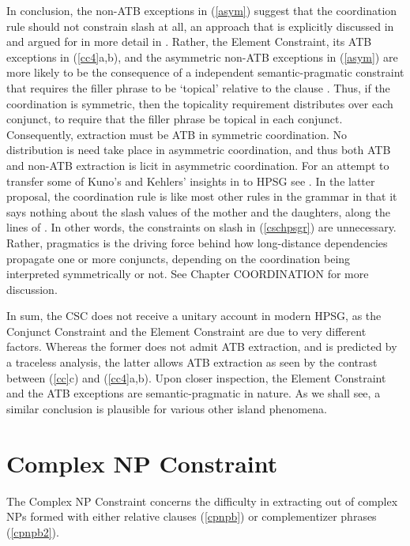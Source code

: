 \documentclass[output=paper]{langsci/langscibook}
\begin{document}
In conclusion, the  non-ATB exceptions in (\ref{asym}) suggest that the coordination rule should not constrain {\sc slash} at all, an approach that is explicitly discussed in \citep[203]{pollardsag} and
argued for in more detail in \citet{chaves}.  Rather,  the Element Constraint, its ATB exceptions in (\ref{cc4}a,b), and the asymmetric non-ATB exceptions in (\ref{asym}) are more likely to be the consequence of a independent semantic-pragmatic constraint that requires the filler phrase to be `topical'  relative to the clause \citep{lakoff86,kuno87,kehler,kubotalee}. Thus, if the coordination is  symmetric, then the topicality requirement  distributes over each conjunct, to require that the  filler phrase be topical in each conjunct. Consequently, extraction must
be ATB in symmetric coordination. No distribution is need take place in asymmetric coordination, and thus both 
ATB and non-ATB extraction is licit in asymmetric coordination. For an attempt to transfer
some of Kuno's and Kehlers' insights in to HPSG  see \citet{chaves}. In the latter proposal,
 the coordination rule is like most other rules in the grammar in that it says nothing about
the {\sc slash} values of the mother and the daughters, along the lines of 
\citet[354]{levhubook}. In other words, the constraints on {\sc slash} in (\ref{cschpsgr}) are unnecessary.  Rather, pragmatics is the driving force behind how  long-distance dependencies propagate one or more conjuncts, depending on the coordination being interpreted symmetrically or not. 
See Chapter COORDINATION for more discussion.

In sum, the CSC does not receive a unitary account in modern HPSG, as the Conjunct Constraint and the Element Constraint  are due to  very different factors. Whereas the former does not admit ATB extraction, and is predicted by a traceless analysis, the latter allows ATB extraction as seen by the contrast between  (\ref{cc}c) and  (\ref{cc4}a,b). 
Upon closer inspection, the Element Constraint and the ATB exceptions are semantic-pragmatic in nature.  As we shall see, a similar conclusion is plausible for various other island phenomena.


\section{Complex NP Constraint}

The Complex NP Constraint concerns the difficulty in extracting out of complex NPs formed with either relative clauses (\ref{cpnpb}) or complementizer phrases (\ref{cpnpb2}).
\end{document}
